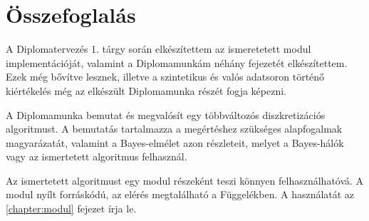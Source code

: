 \chapter{Összefoglalás}

A Diplomatervezés 1. tárgy során elkészítettem az ismeretetett modul implementációját, valamint a Diplomamunkám néhány fejezetét elkészítettem. Ezek még bővítve lesznek, illetve a szintetikus és valós adatsoron történő kiértékelés még az elkészült Diplomamunka részét fogja képezni.

A Diplomamunka bemutat és megvalósít egy többváltozós diszkretizációs algoritmust. A bemutatás tartalmazza a megértéshez szükséges alapfogalmak magyarázatát, valamint a Bayes-elmélet azon részleteit, melyet a Bayes-hálók vagy az ismertetett algoritmus felhasznál.

Az ismertetett algoritmust egy modul részeként teszi könnyen felhasználhatóvá. A modul nyílt forráskódú, az elérés megtalálható a Függelékben. A használatát az \ref{chapter:modul} fejezet írja le.

